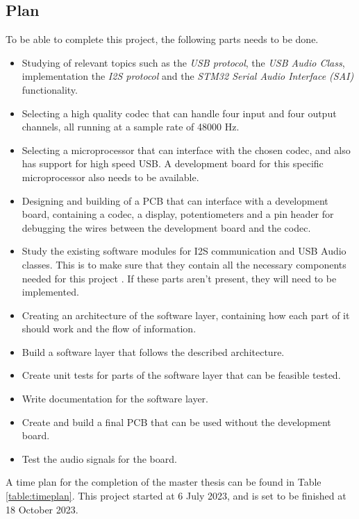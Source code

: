 \subsection{Plan}

To be able to complete this project, the following parts needs to be done.

\begin{itemize}
	\item Studying of relevant topics such as the \textit{USB protocol}, the \textit{USB Audio Class}, 
	implementation the \textit{I2S protocol} and the \textit{STM32 Serial Audio Interface (SAI)} 
	functionality.
	\item Selecting a high quality codec that can handle four input and four output channels, all 
	running at a sample rate of 48000 Hz.
	\item Selecting a microprocessor that can interface with the chosen codec, and also has support for
	high speed USB. A development board for this specific microprocessor also needs to be available.
	\item Designing and building of a PCB that can interface with a development board, containing a codec, 
	a display, potentiometers and a pin header for debugging the wires between the development board and 
	the codec.
	\item Study the existing software modules for I2S communication and USB Audio classes. This is to make
	sure that they contain all the necessary components needed for this project . 
	If these parts aren't present, they will need to be implemented.
	\item Creating an architecture of the software layer, containing how each part of it should work and 
	the flow of information.
	\item Build a software layer that follows the described architecture.
	\item Create unit tests for parts of the software layer that can be feasible tested.
	\item Write documentation for the software layer.
	\item Create and build a final PCB that can be used without the development board.
	\item Test the audio signals for the board.
\end{itemize}

A time plan for the completion of the master thesis can be found in Table \ref{table:timeplan}.
This project started at 6 July 2023, and is set to be finished at 18 October 2023.

